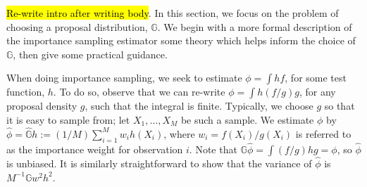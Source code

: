 \documentclass[11pt, oneside]{article}   	%
\newcommand{\bG}{\mathbb{G}}
\begin{document}
\hl{Re-write intro after writing body}. In this section, we focus on the problem of choosing a proposal distribution, $\bG$. We begin with a more formal description of the importance sampling estimator some theory which helps inform the choice of $\bG$, then give some practical guidance. 

When doing importance sampling, we seek to estimate $\phi = \int h f $, for some test function, $h$. To do so, observe that we can re-write $\phi = \int h (f/g) g$, for any proposal density $g$, such that the integral is finite. Typically, we choose $g$ so that it is easy to sample from; let $X_1,\ldots,X_M$ be such a sample. We estimate $\phi$ by $\hat{\phi} = \hat{\bG} h := (1/M) \sum_{i=1}^M w_i h(X_i)$, where $w_i = f(X_i)/g(X_i)$ is referred to as the importance weight for observation $i$. Note that $\bG \hat{\phi} = \int (f/g) h g = \phi$, so  $\hat{\phi}$ is unbiased. It is similarly straightforward to show that the variance of $\hat{\phi}$ is $M^{-1} \bG w^2 h^2$. 
\end{document}
